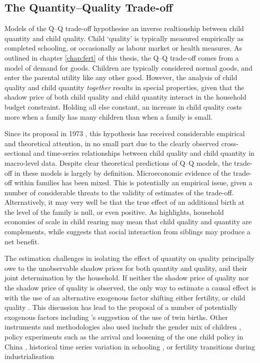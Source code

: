 \subsection{The Quantity--Quality Trade-off}
Models of the Q--Q trade-off hypothesise an inverse realtionship between child
quantity and child quality. Child `quality' is typically measured empirically as
completed schooling, or occasionally as labour market or health measures.  As
outlined in chapter \ref{chap:fert} of this thesis, the Q--Q trade-off comes
from a model of demand for goods.  Children are typically considered normal
goods, and enter the parental utility like any other good. However, the analysis 
of child quality and child quantity \emph{together} results in special 
properties, given that the shadow price of both child quality and child quantity
interact in the household budget constraint.  Holding all else constant, an 
increase in child quality costs more when a family has many children than when
a family is small.

Since its proposal in 1973 \citep{BeckerLewis1973,DeTray1973,Willis1973}, this 
hypothesis has received considerable empirical and theoretical attention, in no 
small part due to the clearly observed cross-sectional and time-series 
relationships between child quality and child quantity in macro-level data.  
Despite clear theoretical predictions of Q--Q models, the trade-off in these
models is largely by definition. Microeconomic evidence of the trade-off within
families has been mixed. This is potentially an empirical issue, given a number 
of considerable threats to the validity of estimates of the trade-off.  
Alternatively, it may very well be that the true effect of an additional birth 
at the level of the family is null, or even positive. As \cite{Qian2009} 
highlights, household economies of scale in child rearing may mean that child 
quality and quantity are complements, while \citet{Iacovou2001} suggests that 
social interaction from siblings may produce a net benefit.

The estimation challenges in isolating the effect of quantity on quality 
principally owe to the unobservable shadow prices for both quantity and
quality, and their joint determination by the household. If neither the shadow 
price of quality nor the shadow price of quality is observed, the only way to 
estimate a causal effect is with the use of an alternative exogenous factor 
shifting either fertility, or child quality \citep{RosenzweigWolpin1980,
RosenzweigWolpin1980b}.  This discussion has lead to the proposal of a number
of potentially exogenous factors including \citeauthor{RosenzweigWolpin1980}'s
suggestion of the use of twin births.  Other instruments and methodologies also 
used includr the gender mix of children \citep{ConleyGlauber2006}, policy 
experiments such as the arrival and loosening of the one child policy in China 
\citep{Qian2009,ArgysAverett2015}, historical time series variation in schooling
\citep{BleakleyLange2009}, or fertility transitions during industrialisation 
\citep{DalgaardStrulik2015}

